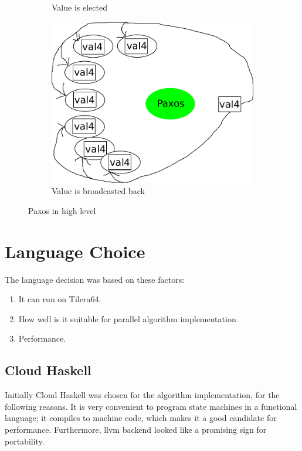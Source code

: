\documentclass[english,11pt]{l4proj}
\begin{document}
\begin{figure}
\begin{subfigure}[b]{0.3\textwidth}
        \caption{Value is elected}
    \end{subfigure}\hfill
    \begin{subfigure}[b]{0.3\textwidth}
        \includegraphics[width=\textwidth]{images/paxos3.pdf}
        \caption{Value is broadcasted back}
    \end{subfigure}

    \caption{Paxos in high level}\label{fig:paxos-highlevel}
\end{figure}

\section{Language Choice}
\label{sec:erlang-why}

The language decision was based on these factors:
\begin{enumerate}
    \item It can run on Tilera64.
    \item How well is it suitable for parallel algorithm implementation.
    \item Performance.
\end{enumerate}

\subsection{Cloud Haskell}

Initially Cloud Haskell\cite{cloud-haskell}  was chosen for the algorithm
implementation, for the following reasons. It is very convenient to program
state machines in a functional language; it compiles to machine code, which
makes it a good candidate for performance. Furthermore, llvm
backend\cite{llvm-haskell} looked like a promising sign for portability.
\end{document}
